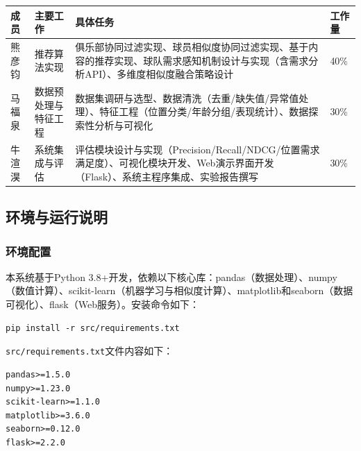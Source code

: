 \documentclass[a4paper]{article}
\begin{document}
\begin{tcolorbox}[enhanced, colback=green!3!white, colframe=green!50!black,
  title=\textbf{表2：团队成员分工明细}, fonttitle=\bfseries,
  arc=4mm, boxrule=1pt, drop fuzzy shadow=green!20]
\begin{table}[H]
\centering
\label{tab:division}
\begin{tabular}{@{}p{1.5cm}p{2.5cm}p{5.5cm}p{1.2cm}@{}}
\toprule
\textbf{成员} & \textbf{主要工作} & \textbf{具体任务} & \textbf{工作量} \\
\midrule
熊彦钧 & 推荐算法实现 & 俱乐部协同过滤实现、球员相似度协同过滤实现、基于内容的推荐实现、球队需求感知机制设计与实现（含需求分析API）、多维度相似度融合策略设计 & 40\% \\
\midrule
马福泉 & 数据预处理与特征工程 & 数据集调研与选型、数据清洗（去重/缺失值/异常值处理）、特征工程（位置分类/年龄分组/表现统计）、数据探索性分析与可视化 & 30\% \\
\midrule
牛渲淏 & 系统集成与评估 & 评估模块设计与实现（Precision/Recall/NDCG/位置需求满足度）、可视化模块开发、Web演示界面开发（Flask）、系统主程序集成、实验报告撰写 & 30\% \\
\bottomrule
\end{tabular}
\end{table}
\end{tcolorbox}

\subsection{环境与运行说明}

\subsubsection{环境配置}

本系统基于Python 3.8+开发，依赖以下核心库：pandas（数据处理）、numpy（数值计算）、scikit-learn（机器学习与相似度计算）、matplotlib和seaborn（数据可视化）、flask（Web服务）。安装命令如下：

\begin{verbatim}
pip install -r src/requirements.txt
\end{verbatim}

\texttt{src/requirements.txt}文件内容如下：

\begin{verbatim}
pandas>=1.5.0
numpy>=1.23.0
scikit-learn>=1.1.0
matplotlib>=3.6.0
seaborn>=0.12.0
flask>=2.2.0
\end{verbatim}
\end{document}

